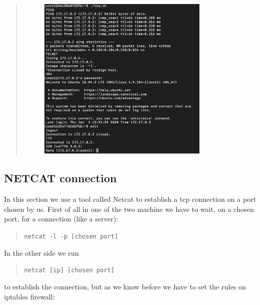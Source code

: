 \documentclass[11pt]{article}
\begin{document}
\begin{quote}
  \begin{figure}[!ht]
    \centering
    \includegraphics[width=0.8\textwidth]{pic7-hw8-1635747.png}
    \label{fig:conf}
  \end{figure}

\end{quote}

\subsection{NETCAT connection}
In this section we use a tool called Netcat to establish a tcp connection on a port chosen by us. First of all in one of the two machine we have to wait, on a chosen port, for a connection (like a server):

\begin{quote}
  \texttt{netcat -l -p [chosen port]}
\end{quote}

In the other side we run

\begin{quote}
  \texttt{netcat [ip] [chosen port]}
\end{quote}

to establish the connection, but as we know before we have to set the rules on iptables firewall:
\end{document}
